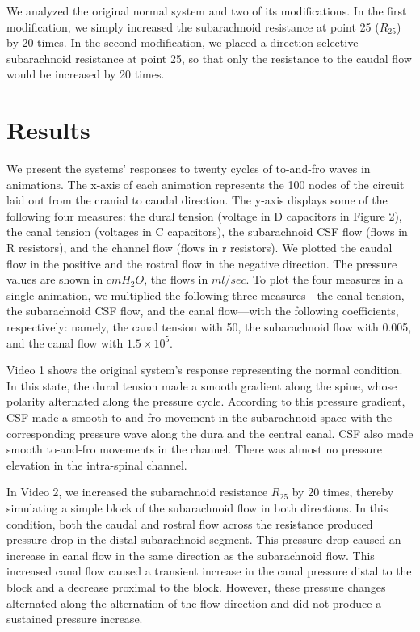 \documentclass[fleqn,10pt]{wlscirep}
\begin{document}
We analyzed the original normal system and two of its modifications. In the
first modification, we simply increased the subarachnoid resistance at
point 25 ($R_{25}$) by 20 times. In the second modification, we placed a
direction-selective subarachnoid resistance at point 25, so that only the
resistance to the caudal flow would be increased by 20 times.

\section*{Results}

We present the systems' responses to twenty cycles of to-and-fro waves in
animations. The x-axis of each animation represents the 100 nodes of the
circuit laid out from the cranial to caudal direction. The y-axis displays
some of the following four measures: the dural tension (voltage in D
capacitors in Figure 2), the canal tension (voltages in C capacitors), the
subarachnoid CSF flow (flows in R resistors), and the channel flow (flows
in r resistors). We plotted the caudal flow in the positive and the rostral
flow in the negative direction. The pressure values are shown in $cmH_2O$,
the flows in $ml/sec$. To plot the four measures in a single animation, we
multiplied the following three measures---the canal tension, the
subarachnoid CSF flow, and the canal flow---with the following
coefficients, respectively: namely, the canal tension with 50, the
subarachnoid flow with 0.005, and the canal flow with $1.5\times10^{5}$. 

Video 1 shows the original system's response representing the normal
condition. In this state, the dural tension made a smooth gradient along
the spine, whose polarity alternated along the pressure cycle. According to
this pressure gradient, CSF made a smooth to-and-fro movement in the
subarachnoid space with the corresponding pressure wave along the dura and
the central canal. CSF also made smooth to-and-fro movements in the
channel. There was almost no pressure elevation in the intra-spinal
channel.


In Video 2, we increased the subarachnoid resistance
$R_{25}$ by 20 times, thereby simulating a simple block of the subarachnoid
flow in both directions. In this condition, both the caudal and rostral
flow across the resistance produced pressure drop in the distal
subarachnoid segment.  This pressure drop caused an increase in canal flow
in the same direction as the subarachnoid flow. This increased canal flow
caused a transient increase in the canal pressure distal to the block and a
decrease proximal to the block. However, these pressure changes alternated
along the alternation of the flow direction and did not produce a sustained
pressure increase.
\end{document}
